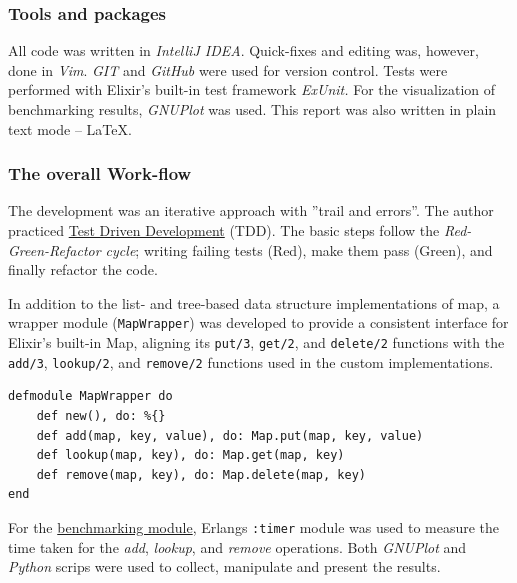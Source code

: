 \documentclass[a4paper,11pt]{article}
\begin{document}
\subsubsection*{Tools and packages}
\label{subsec:tools}
All code was written in \emph{IntelliJ IDEA}.
Quick-fixes and editing was, however, done in \emph{Vim}. 
\emph{GIT} and \emph{GitHub} were used for version control.
Tests were performed with Elixir's built-in test framework \emph{ExUnit.}
For the visualization of benchmarking results, \emph{GNUPlot} was used.
This report was also written in plain text mode -- \LaTeX.

\subsubsection*{The overall Work-flow} %
\label{subsec:workflow}
The development was an iterative approach with ''trail and errors''.
The author practiced
\href{https://www.elixirwiki.com/wiki/Test-Driven_Development_in_Elixir}{Test Driven Development}
(TDD).
The basic steps follow the \emph{Red-Green-Refactor cycle};
writing failing tests (Red), make them pass (Green),
and finally refactor the code.

In addition to the list- and tree-based data structure implementations of map,
a wrapper module (\texttt{MapWrapper}) was developed to provide a
consistent interface for Elixir’s built-in Map,
aligning its
\texttt{put/3},
\texttt{get/2}, and
\texttt{delete/2} functions with the
\texttt{add/3},
\texttt{lookup/2}, and
\texttt{remove/2} functions used in the custom implementations.
\begin{verbatim}
defmodule MapWrapper do
    def new(), do: %{}
    def add(map, key, value), do: Map.put(map, key, value)
    def lookup(map, key), do: Map.get(map, key)
    def remove(map, key), do: Map.delete(map, key)
end
\end{verbatim}
For the
\href{https://github.com/VincentFerrigan/kth-id1019-programming-ii/blob/main/tasks/2/mymaps/lib/benchmark.ex}{benchmarking module},
Erlangs
\texttt{:timer} module was used to measure the time taken for the
\emph{add}, \emph{lookup}, and \emph{remove} operations.
Both \emph{GNUPlot} and \emph{Python} scrips were used to collect, manipulate and present the results.
\end{document}
